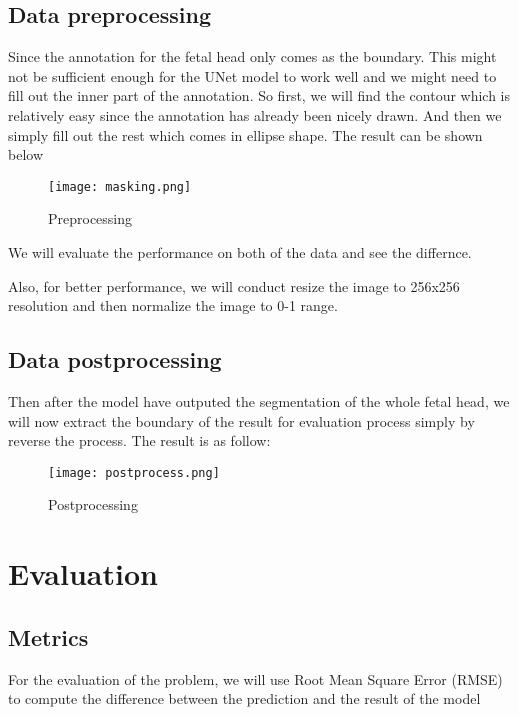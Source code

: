 \documentclass{article}
\begin{document}
\subsection{Data preprocessing} Since the annotation for the fetal
head only comes as the boundary. This might not be sufficient enough
for the UNet model to work well and we might need to fill out the inner
part of the annotation. So first, we will find the contour which is relatively
easy since the annotation has already been nicely drawn. And then we simply fill
out the rest which comes in ellipse shape. The result can be shown below

\begin{figure}[h]
    \centering
    \texttt{[image: masking.png]}
    \caption{Preprocessing}
\end{figure}

\noindent We will evaluate the performance on both of the data and
see the differnce.

\noindent Also, for better performance, we will conduct resize the image to
256x256 resolution and then normalize the image to 0-1 range.

\subsection{Data postprocessing} Then after the model have outputed the
segmentation of the whole fetal head, we will now extract the boundary
of the result for evaluation process simply by reverse the process.
The result is as follow:

\begin{figure}[h]
    \centering
    \texttt{[image: postprocess.png]}
    \caption{Postprocessing}
\end{figure}

\section{Evaluation}

\subsection{Metrics}
For the evaluation of the problem, we will use Root Mean Square Error (RMSE)
to compute the difference between the prediction and the result of the model
\end{document}
